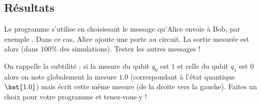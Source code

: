 \documentclass[11pt,class=report,crop=false]{standalone}
\begin{document}
\subsection{Résultats}

Le programme s'utilise en choisissant le message qu'Alice envoie à Bob, par exemple . Dans ce cas, Alice ajoute une porte  au circuit. La sortie mesurée est alors  (dans $100\%$ des simulations). Testez les autres messages !

On rappelle la subtilité : si la mesure du qubit $q_0$ est $1$ et celle du qubit $q_1$ est $0$ alors on note globalement la mesure $1.0$ (correspondant à l'état quantique $\ket{1.0}$) mais \qiskit{} écrit cette même mesure  (de la droite vers la gauche). Faites un choix pour votre programme et tenez-vous-y !
\end{document}
